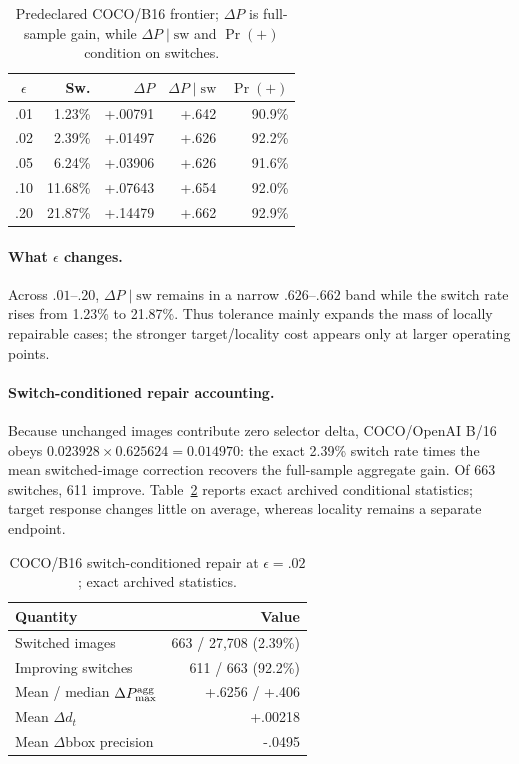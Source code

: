 \documentclass[10pt]{article}
\begin{document}
\begin{table}[!t]
\centering
\caption{Predeclared COCO/B16 frontier; $\Delta P$ is full-sample gain, while $\Delta P\mid\mathrm{sw}$ and $\Pr(+)$ condition on switches.}
\label{tab:frontier}
\small
\setlength{\tabcolsep}{2.0pt}
\renewcommand{\arraystretch}{0.95}
\begin{tabular}{crrrr}
\toprule
$\epsilon$ & Sw. & $\Delta P$ & $\Delta P\mid\mathrm{sw}$ & $\Pr(+)$\\
\midrule
.01 & 1.23\% & +.00791 & +.642 & 90.9\%\\
.02 & 2.39\% & +.01497 & +.626 & 92.2\%\\
.05 & 6.24\% & +.03906 & +.626 & 91.6\%\\
.10 & 11.68\% & +.07643 & +.654 & 92.0\%\\
.20 & 21.87\% & +.14479 & +.662 & 92.9\%\\
\bottomrule
\end{tabular}
\end{table}

\paragraph{What $\epsilon$ changes.}
Across $.01$--$.20$, $\Delta P\mid\mathrm{sw}$ remains in a narrow $.626$--$.662$ band while the switch rate rises from 1.23\% to 21.87\%. Thus tolerance mainly expands the mass of locally repairable cases; the stronger target/locality cost appears only at larger operating points.

\newpage
\paragraph{Switch-conditioned repair accounting.}
Because unchanged images contribute zero selector delta, COCO/OpenAI B/16 obeys
$0.023928\times0.625624=0.014970$: the exact 2.39\% switch rate times the mean
switched-image correction recovers the full-sample aggregate gain. Of 663 switches,
611 improve. Table~\ref{tab:repair_accounting} reports exact archived conditional
statistics; target response changes little on average, whereas locality remains a
separate endpoint.

\begin{table}[!h]
\centering
\caption{COCO/B16 switch-conditioned repair at $\epsilon=.02$; exact archived statistics.}
\label{tab:repair_accounting}
\small
\setlength{\tabcolsep}{3.0pt}
\renewcommand{\arraystretch}{0.94}
\begin{tabular}{lr}
\toprule
Quantity & Value\\
\midrule
Switched images & 663 / 27,708 (2.39\%)\\
Improving switches & 611 / 663 (92.2\%)\\
Mean / median $\Delta P_{\max}^{\rm agg}$ & +.6256 / +.406\\
Mean $\Delta d_t$ & +.00218\\
Mean $\Delta$bbox precision & -.0495\\
\bottomrule
\end{tabular}
\end{table}
\end{document}
